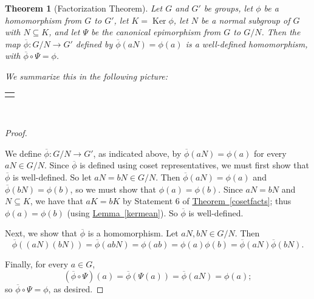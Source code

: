 \documentclass[10pt,]{book}
\theoremstyle{plain}
\newtheorem{theorem}{Theorem}[section]
\theoremstyle{definition}
\theoremstyle{definition}
\theoremstyle{definition}
\theoremstyle{definition}
\numberwithin{equation}{section}
\newlength{\panelmax}
\def\phibar{\overline{\phi}}
\DeclareMathOperator{\Ker}{Ker}
\begin{document}
\begin{theorem}[{Factorization Theorem}]\label{facthm}
Let \(G\) and \(G'\) be groups, let \(\phi\) be a homomorphism from \(G\) to \(G'\), let \(K=\Ker \phi\), let \(N\) be a normal subgroup of \(G\) with \(N\subseteq K\), and let \(\Psi\) be the canonical epimorphism from \(G\) to \(G/N\). Then the map \(\phibar: G/N \to G'\) defined by \(\phibar(aN)=\phi(a)\) is a well-defined homomorphism, with \(\phibar \circ \Psi=\phi\).%
\par
We  summarize this in the following picture:%
{%
\setlength{\panelmax}{0pt}
\newsavebox{\panelboxGimage}
\begin{lrbox}{\panelboxGimage}
\resizebox{0.3\linewidth}{!}{{
\xymatrix{G\ar[rr]^{\phi}\ar[dr]_{\Psi}&&G'\\&G/N\ar@{.>}[ur]_{\phibar}&}
}
}\end{lrbox}
\newlength{\phGimage}\setlength{\phGimage}{\ht\panelboxGimage+\dp\panelboxGimage}
\settototalheight{\phGimage}{\usebox{\panelboxGimage}}
\setlength{\panelmax}{\maxof{\panelmax}{\phGimage}}
\leavevmode%
\setlength{\tabcolsep}{0\linewidth}
\par\medskip\noindent
\hspace*{0.35\linewidth}%
\begin{tabular}{@{}*{1}{c}@{}}
\begin{minipage}[c][\panelmax][t]{0.3\linewidth}\usebox{\panelboxGimage}\end{minipage}\end{tabular}\\
}%
\end{theorem}
\begin{proof}\hypertarget{proof-55}{}
We define \(\phibar: G/N\to G'\), as indicated above, by \(\phibar(aN)=\phi(a)\) for every \(aN\in G/N\). Since \(\phibar\) is defined using coset representatives, we must first show that \(\phibar\) is well-defined. So let \(aN=bN\in G/N\). Then \(\phibar(aN)=\phi(a)\) and \(\phibar(bN)=\phi(b)\), so we must show that \(\phi(a)=\phi(b)\). Since \(aN=bN\) and \(N\subseteq K\), we have that \(aK=bK\) by Statement 6 of \hyperref[cosetfacts]{Theorem~\ref{cosetfacts}}; thus \(\phi(a)=\phi(b)\) (using \hyperref[kermean]{Lemma~\ref{kermean}}). So \(\phibar\) is well-defined.%
\par
Next, we show that \(\phibar\) is a homomorphism. Let \(aN,bN\in
G/N\). Then%
\begin{equation*}
\phibar((aN)(bN))=\phibar(abN)=\phi(ab)=\phi(a)\phi(b)=\phibar(aN)\phibar(bN).
\end{equation*}
%
\par
Finally, for every \(a\in G\),%
\begin{equation*}
(\phibar \circ
\Psi)(a)=\phibar(\Psi(a))=\phibar(aN)=\phi(a);
\end{equation*}
so \(\phibar \circ
\Psi = \phi\), as desired.%
\end{proof}
\end{document}

